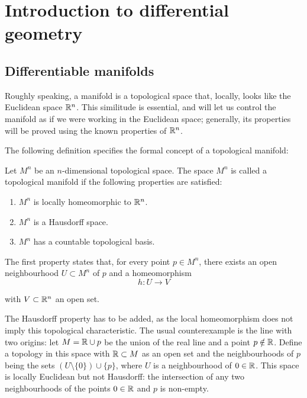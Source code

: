 \chapter{Introduction to differential geometry}

\section{Differentiable manifolds}

Roughly speaking, a manifold is a topological space that, locally, looks like the Euclidean space $\mathbb{R}^n$. This similitude is essential, and will let us control the manifold as if we were working in the Euclidean space; generally, its properties will be proved using the known properties of $\mathbb{R}^n$.

The following definition specifies the formal concept of a topological manifold:

\begin{definition}
    Let $M^n$ be an $n$-dimensional topological space. The space $M^n$ is called a topological manifold if the following properties are satisfied:
    \begin{enumerate}
        \item $M^n$ is locally homeomorphic to $\mathbb{R}^n$. \label{def:manifold:homeo}
        \item $M^n$ is a Hausdorff space. \label{def:manifold:haussdorf}
        \item $M^n$ has a countable topological basis. \label{def:manifold:basis}
    \end{enumerate}
\end{definition}

The first property states that, for every point $p \in M^n$, there exists an open neighbourhood $U \subset M^n$ of $p$ and a homeomorphism
\[
    h \colon U \to V
\]

with $V \subset \mathbb{R}^n$ an open set.

The Hausdorff property has to be added, as the local homeomorphism does not imply this topological characteristic. The usual counterexample is the line with two origins: let $M = \mathbb{R} \cup p$ be the union of the real line and a point $p \notin \mathbb{R}$. Define a topology in this space with $\mathbb{R} \subset M$ as an open set and the neighbourhoods of $p$ being the sets $(U \setminus \{0\}) \cup \{p\}$, where $U$ is a neighbourhood of $0 \in \mathbb{R}$. This space is locally Euclidean but not Hausdorff: the intersection of any two neighbourhoods of the points $0 \in \mathbb{R}$ and $p$ is non-empty.

